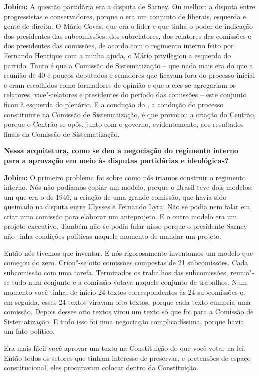 \textbf{Jobim:} A questão partidária era a disputa de Sarney. Ou melhor:
a disputa entre progressistas e conservadores, porque o  era um
conjunto de liberais, esquerda e gente de direita. O Mário Covas, que
era o líder e que tinha o poder de indicação dos presidentes das
subcomissões, dos subrelatores, dos relatores das comissões e dos
presidentes das comissões, de acordo com o regimento interno feito por
Fernando Henrique com a minha ajuda, o Mário privilegiou a esquerda do
partido. Tanto é que a Comissão de Sistematização -- que nada mais era
do que a reunião de 40 e poucos deputados e senadores que ficavam fora
do processo inicial e eram escolhidos como formadores de opinião e que a
eles se agregariam os relatores, vice"-relatores e presidentes do período
das comissões -- este conjunto ficou à esquerda do plenário. E a
condução do , a condução do processo constituinte na Comissão de
Sistematização, é que provocou a criação do Centrão, porque o Centrão se
opôs, junto com o governo, evidentemente, aos resultados finais da
Comissão de Sistematização.

\textbf{Nessa arquitetura, como se deu a negociação do regimento interno
para a aprovação em meio às disputas partidárias e ideológicas?}

\textbf{Jobim:} O primeiro problema foi sobre como nós iriamos construir
o regimento interno. Nós não podíamos copiar um modelo, porque o Brasil
teve dois modelos: um que era o de 1946, a criação de uma grande
comissão, que havia sido queimado na disputa entre Ulysses e Fernando
Lyra. Não se podia nem falar em criar uma comissão para elaborar um
anteprojeto. E o outro modelo era um projeto executivo. Também não se
podia falar nisso porque o presidente Sarney não tinha condições
políticas naquele momento de mandar um projeto.

Então nós tivemos que inventar. E nós rigorosamente inventamos um modelo
que começou do zero. Criou"-se oito comissões compostas de 21
subcomissões. Cada subcomissão com uma tarefa. Terminados os trabalhos
das subcomissões, reunia"-se tudo num conjunto e a comissão votava
naquele conjunto de trabalhos. Num momento você tinha, de início 24
textos correspondentes às 24 subcomissões e, em seguida, esses 24 textos
viravam oito textos, porque cada texto cumpria uma comissão. Depois
desses oito textos virou um texto só que foi para a Comissão de
Sistematização. E tudo isso foi uma negociação complicadíssima, porque
havia um fato político.

Era mais fácil você aprovar um texto na Constituição do que você votar
na lei. Então todos os setores que tinham interesse de preservar, e
pretensões de espaço constitucional, eles procuravam colocar dentro da
Constituição.

